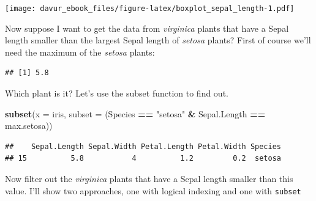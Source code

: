 \documentclass[]{book}
\newenvironment{Shaded}{\begin{snugshade}}{\end{snugshade}}
\newcommand{\CommentTok}[1]{\textcolor[rgb]{0.56,0.35,0.01}{\textit{#1}}}
\newcommand{\DataTypeTok}[1]{\textcolor[rgb]{0.13,0.29,0.53}{#1}}
\newcommand{\KeywordTok}[1]{\textcolor[rgb]{0.13,0.29,0.53}{\textbf{#1}}}
\newcommand{\NormalTok}[1]{#1}
\newcommand{\OperatorTok}[1]{\textcolor[rgb]{0.81,0.36,0.00}{\textbf{#1}}}
\newcommand{\StringTok}[1]{\textcolor[rgb]{0.31,0.60,0.02}{#1}}
\begin{document}
\texttt{[image: davur\_ebook\_files/figure-latex/boxplot\_sepal\_length-1.pdf]}

Now suppose I want to get the data from \emph{virginica} plants that have a Sepal length smaller than the largest Sepal length of \emph{setosa} plants?
First of course we'll need the maximum of the \emph{setosa} plants:

\begin{Shaded}
\end{Shaded}

\begin{verbatim}
## [1] 5.8
\end{verbatim}

Which plant is it? Let's use the subset function to find out.

\begin{Shaded}
\begin{Highlighting}[]
\KeywordTok{subset}\NormalTok{(}\DataTypeTok{x =}\NormalTok{ iris,}
       \DataTypeTok{subset =}\NormalTok{ (Species }\OperatorTok{==}\StringTok{ "setosa"} \OperatorTok{&}\StringTok{ }\NormalTok{Sepal.Length }\OperatorTok{==}\StringTok{ }\NormalTok{max.setosa))}
\end{Highlighting}
\end{Shaded}

\begin{verbatim}
##    Sepal.Length Sepal.Width Petal.Length Petal.Width Species
## 15          5.8           4          1.2         0.2  setosa
\end{verbatim}

Now filter out the \emph{virginica} plants that have a Sepal length smaller than this value. I'll show two approaches, one with logical indexing and one with \texttt{subset}

\begin{Shaded}
\end{Shaded}
\end{document}
